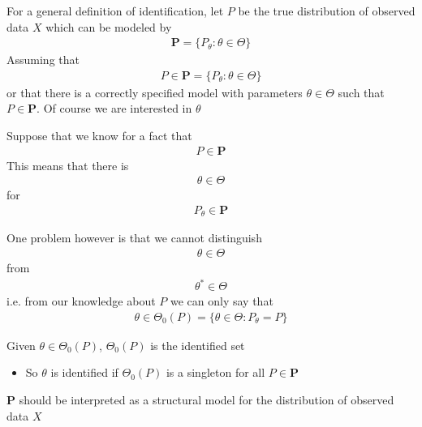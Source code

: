 \documentclass{beamer}
\begin{document}
\begin{frame}
 For a general definition of identification, let $P$ be the true distribution of observed data $X$ which can be modeled by
 \begin{align}
   \mathbf{P} = \{P_{\theta}: \theta \in \Theta  \}
 \end{align}
 \medskip
 Assuming that 
 \begin{align}
   P \in \mathbf{P} = \{P_{\theta}: \theta \in \Theta  \}
 \end{align}
 or that there is a correctly specified model with parameters $\theta \in \Theta$ such that $P \in \mathbf{P}$.
 Of course we are interested in $\theta$  
\end{frame}

\begin{frame}
  Suppose that we know for a fact that 
  \begin{align}
    P \in \mathbf{P}
  \end{align}
  \medskip
  This means that there is  
  \begin{align}
    \theta \in \Theta
  \end{align}
  for 
  \begin{align}
    P_{\theta} \in \mathbf{P}
  \end{align}
\end{frame}


\begin{frame}
 One problem however is that we cannot distinguish 
 \begin{align}
   \theta \in \Theta
 \end{align}
 from
 \begin{align}
   \theta^* \in \Theta
 \end{align}
 \medskip
 i.e. from our knowledge about $P$ we can only say that 
  \begin{align}
    \theta \in \Theta_0(P)= \{\theta \in \Theta: P_{\theta} = P\}
  \end{align}
\end{frame}

\begin{frame}
 Given $\theta \in \Theta_0(P)$, $\Theta_0(P)$ is the identified set    
  \begin{itemize}
    \item So $\theta$ is identified if $\Theta_0 (P)$ is a singleton for all $P \in \mathbf{P}$
  \end{itemize} 
  \medskip
  $\mathbf{P}$ should be interpreted as a structural model for the distribution of observed data $X$
\end{frame}
\end{document}
